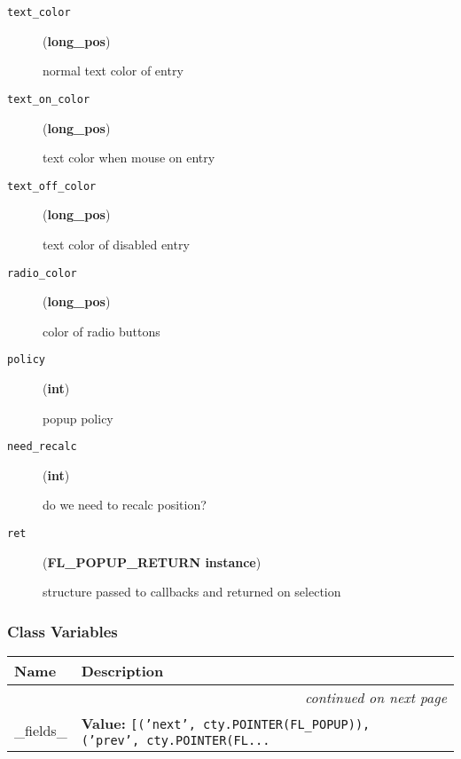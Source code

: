 \begin{description}
\item[{\texttt{text\_color}}] \leavevmode (\textbf{long\_pos})

normal text color of entry

\item[{\texttt{text\_on\_color}}] \leavevmode (\textbf{long\_pos})

text color when mouse on entry

\item[{\texttt{text\_off\_color}}] \leavevmode (\textbf{long\_pos})

text color of disabled entry

\item[{\texttt{radio\_color}}] \leavevmode (\textbf{long\_pos})

color of radio buttons

\item[{\texttt{policy}}] \leavevmode (\textbf{int})

popup policy

\item[{\texttt{need\_recalc}}] \leavevmode (\textbf{int})

do we need to recalc position?

\item[{\texttt{ret}}] \leavevmode (\textbf{FL\_POPUP\_RETURN instance})

structure passed to callbacks and returned on selection

\end{description}




  \subsubsection{Class Variables}

    \vspace{-1cm}
\hspace{\varindent}\begin{longtable}{|p{\varnamewidth}|p{\vardescrwidth}|l}
\cline{1-2}
\cline{1-2} \centering \textbf{Name} & \centering \textbf{Description}& \\
\cline{1-2}
\endhead\cline{1-2}\multicolumn{3}{r}{\small\textit{continued on next page}}\\\endfoot\cline{1-2}
\endlastfoot\raggedright \_\-f\-i\-e\-l\-d\-s\-\_\- & \raggedright \textbf{Value:} 
{\tt [('next', cty.POINTER(FL\_POPUP)), ('prev', cty.POINTER(FL\texttt{...}}&\\
\cline{1-2}
\end{longtable}

